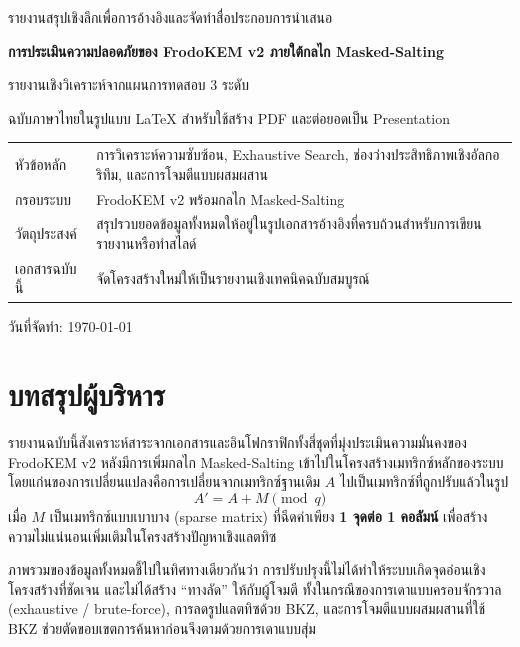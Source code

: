 \documentclass[12pt,a4paper]{article}
\newcommand{\term}[1]{\textbf{#1}}
\newcommand{\eng}[1]{\textenglish{#1}}
\begin{document}
	
	\begin{titlepage}
		\centering
		{\Large รายงานสรุปเชิงลึกเพื่อการอ้างอิงและจัดทำสื่อประกอบการนำเสนอ\par}
		\vspace{1.2cm}
		{\huge\bfseries การประเมินความปลอดภัยของ \eng{FrodoKEM v2} ภายใต้กลไก \eng{Masked-Salting}\par}
		\vspace{0.8cm}
		{\LARGE รายงานเชิงวิเคราะห์จากแผนการทดสอบ 3 ระดับ\par}
		\vspace{1.3cm}
		{\large ฉบับภาษาไทยในรูปแบบ \eng{LaTeX} สำหรับใช้สร้าง \eng{PDF} และต่อยอดเป็น \eng{Presentation}\par}
		\vfill
		\begin{tabular}{>{\raggedright\arraybackslash}p{} p{}}
			หัวข้อหลัก & การวิเคราะห์ความซับซ้อน, \eng{Exhaustive Search}, ช่องว่างประสิทธิภาพเชิงอัลกอริทึม, และการโจมตีแบบผสมผสาน \\
			กรอบระบบ & \eng{FrodoKEM v2} พร้อมกลไก \eng{Masked-Salting} \\
			วัตถุประสงค์ & สรุปรวบยอดข้อมูลทั้งหมดให้อยู่ในรูปเอกสารอ้างอิงที่ครบถ้วนสำหรับการเขียนรายงานหรือทำสไลด์ \\
			เอกสารฉบับนี้ & จัดโครงสร้างใหม่ให้เป็นรายงานเชิงเทคนิคฉบับสมบูรณ์ \\
		\end{tabular}
		\vfill
		{\large วันที่จัดทำ: \today\par}
	\end{titlepage}
	
	\tableofcontents
	\newpage
	
	\section{บทสรุปผู้บริหาร}
	
	รายงานฉบับนี้สังเคราะห์สาระจากเอกสารและอินโฟกราฟิกทั้งสี่ชุดที่มุ่งประเมินความมั่นคงของ \eng{FrodoKEM v2} หลังมีการเพิ่มกลไก \eng{Masked-Salting} เข้าไปในโครงสร้างเมทริกซ์หลักของระบบ โดยแก่นของการเปลี่ยนแปลงคือการเปลี่ยนจากเมทริกซ์ฐานเดิม $A$ ไปเป็นเมทริกซ์ที่ถูกปรับแล้วในรูป
	\[
	A' = A + M \pmod q
	\]
	เมื่อ $M$ เป็นเมทริกซ์แบบเบาบาง \eng{(sparse matrix)} ที่ฉีดค่าเพียง \term{1 จุดต่อ 1 คอลัมน์} เพื่อสร้างความไม่แน่นอนเพิ่มเติมในโครงสร้างปัญหาเชิงแลตทิซ
	
	ภาพรวมของข้อมูลทั้งหมดชี้ไปในทิศทางเดียวกันว่า การปรับปรุงนี้ไม่ได้ทำให้ระบบเกิดจุดอ่อนเชิงโครงสร้างที่ชัดเจน และไม่ได้สร้าง ``ทางลัด'' ให้กับผู้โจมตี ทั้งในกรณีของการเดาแบบครอบจักรวาล \eng{(exhaustive / brute-force)}, การลดรูปแลตทิซด้วย \eng{BKZ}, และการโจมตีแบบผสมผสานที่ใช้ \eng{BKZ} ช่วยตัดขอบเขตการค้นหาก่อนจึงตามด้วยการเดาแบบสุ่ม
	
\end{document}
